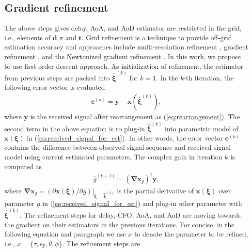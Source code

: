 \documentclass[journal]{IEEEtran}
\newcommand{\CFO}[0]{\epsilon_{\text{F}}}
\begin{document}



\subsection{Gradient refinement}
The above steps gives delay, AoA, and AoD estimator are restricted in the grid, i.e., elements of $\mathbf{d},\mathbf{r}$ and $\mathbf{t}$. Grid refinement is a technique to provide off-grid estimation accuracy and approaches include multi-resolution refinement \cite{1468495}, gradient refinement \cite{4494458}, and the Newtonized gradient refinement \cite{7491265}. In this work, we propose to use first order descent approach. As initialization of refinement, the estimator from previous steps are packed into $\hat{\boldsymbol{\xi}}^{(k)}$ for $k=1$. In the $k$-th iteration, the following error vector is evaluated
\begin{align}
\mathbf{e}^{(k)} = \mathbf{y} - \mathbf{x}\left(\hat{\boldsymbol{\xi}}^{(k)}\right),
\label{eq:residual_error}
\end{align}
where $\mathbf{y}$ is the received signal after rearrangement as (\ref{eq:rearrangement}). The second term in the above equation is to plug-in $\hat{\boldsymbol{\xi}}^{(k)}$ into parametric model of $\mathbf{x}(\boldsymbol\xi)$ in (\ref{eq:received_signal_for_est}). In other words, the error vector $\mathbf{e}^{(k)}$ contains the difference between observed signal sequence and received signal model using current estimated parameters. The complex gain in iteration $k$ is computed as
\begin{align}
\hat{g}^{(k+1)} = (\boldsymbol{\nabla}\mathbf{x}_{g})^{\dagger}\mathbf{y},
\label{eq:gain_refinement}
\end{align}
where $\boldsymbol{\nabla}\mathbf{x}_{g} = (\partial \mathbf{x}(\boldsymbol{\xi})/\partial g)|_{\boldsymbol{\xi} = \hat{\boldsymbol{\xi}}^{(k)}}$ is the partial derivative of $\mathbf{x}(\boldsymbol{\xi})$ over parameter $g$ in (\ref{eq:received_signal_for_est}) and plug-in other parameter with $\hat{\boldsymbol{\xi}}^{(k)}$. The refinement steps for delay, CFO, AoA, and AoD are moving towards the gradient on their estimators in the previous iterations. For concise, in the following equation and paragraph we use $x$ to denote the parameter to be refined, i.e., $x=\{\tau, \CFO,\theta,\phi\}$. The refinement steps are
\end{document}
